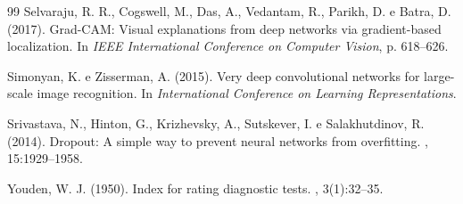 \documentclass[12pt]{article}
\begin{document}
\begin{thebibliography}{99}
Selvaraju, R. R., Cogswell, M., Das, A., Vedantam, R., Parikh, D. e Batra, D. (2017).
\newblock Grad-CAM: Visual explanations from deep networks via gradient-based localization.
\newblock In {\em IEEE International Conference on Computer Vision}, p. 618--626.

Simonyan, K. e Zisserman, A. (2015).
\newblock Very deep convolutional networks for large-scale image recognition.
\newblock In {\em International Conference on Learning Representations}.

Srivastava, N., Hinton, G., Krizhevsky, A., Sutskever, I. e Salakhutdinov, R. (2014).
\newblock Dropout: A simple way to prevent neural networks from overfitting.
, 15:1929--1958.

Youden, W. J. (1950).
\newblock Index for rating diagnostic tests.
, 3(1):32--35.

\end{thebibliography}
\end{document}
